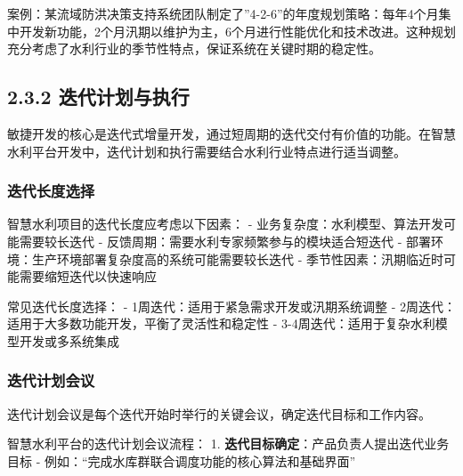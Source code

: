 案例：某流域防洪决策支持系统团队制定了''4-2-6''的年度规划策略：每年4个月集中开发新功能，2个月汛期以维护为主，6个月进行性能优化和技术改进。这种规划充分考虑了水利行业的季节性特点，保证系统在关键时期的稳定性。

\subsection{2.3.2
迭代计划与执行}\label{ux8fedux4ee3ux8ba1ux5212ux4e0eux6267ux884c}

敏捷开发的核心是迭代式增量开发，通过短周期的迭代交付有价值的功能。在智慧水利平台开发中，迭代计划和执行需要结合水利行业特点进行适当调整。

\subsubsection{迭代长度选择}\label{ux8fedux4ee3ux957fux5ea6ux9009ux62e9}

智慧水利项目的迭代长度应考虑以下因素： -
业务复杂度：水利模型、算法开发可能需要较长迭代 -
反馈周期：需要水利专家频繁参与的模块适合短迭代 -
部署环境：生产环境部署复杂度高的系统可能需要较长迭代 -
季节性因素：汛期临近时可能需要缩短迭代以快速响应

常见迭代长度选择： - 1周迭代：适用于紧急需求开发或汛期系统调整 -
2周迭代：适用于大多数功能开发，平衡了灵活性和稳定性 -
3-4周迭代：适用于复杂水利模型开发或多系统集成

\subsubsection{迭代计划会议}\label{ux8fedux4ee3ux8ba1ux5212ux4f1aux8bae}

迭代计划会议是每个迭代开始时举行的关键会议，确定迭代目标和工作内容。

智慧水利平台的迭代计划会议流程： 1.
\textbf{迭代目标确定}：产品负责人提出迭代业务目标 -
例如：``完成水库群联合调度功能的核心算法和基础界面''

